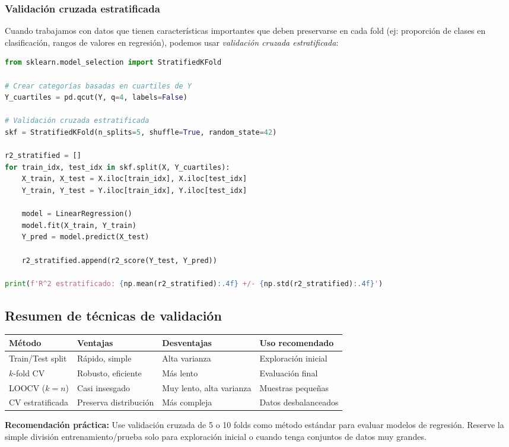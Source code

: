 \subsubsection{Validación cruzada estratificada}

Cuando trabajamos con datos que tienen características importantes que deben preservarse en cada fold (ej: proporción de clases en clasificación, rangos de valores en regresión), podemos usar \emph{validación cruzada estratificada}:

\begin{lstlisting}[language=Python]
from sklearn.model_selection import StratifiedKFold

# Crear categorías basadas en cuartiles de Y
Y_cuartiles = pd.qcut(Y, q=4, labels=False)

# Validación cruzada estratificada
skf = StratifiedKFold(n_splits=5, shuffle=True, random_state=42)

r2_stratified = []
for train_idx, test_idx in skf.split(X, Y_cuartiles):
    X_train, X_test = X.iloc[train_idx], X.iloc[test_idx]
    Y_train, Y_test = Y.iloc[train_idx], Y.iloc[test_idx]
    
    model = LinearRegression()
    model.fit(X_train, Y_train)
    Y_pred = model.predict(X_test)
    
    r2_stratified.append(r2_score(Y_test, Y_pred))

print(f'R^2 estratificado: {np.mean(r2_stratified):.4f} +/- {np.std(r2_stratified):.4f}')
\end{lstlisting}

\subsection{Resumen de técnicas de validación}

\begin{center}
	\begin{tabular}{|l|l|l|l|}\hline
		\textbf{Método} & \textbf{Ventajas} & \textbf{Desventajas} & \textbf{Uso recomendado} \\\hline
		Train/Test split & Rápido, simple & Alta varianza & Exploración inicial \\\hline
		$k$-fold CV & Robusto, eficiente & Más lento & Evaluación final \\\hline
		LOOCV ($k=n$) & Casi insesgado & Muy lento, alta varianza & Muestras pequeñas \\\hline
		CV estratificada & Preserva distribución & Más compleja & Datos desbalanceados \\\hline
	\end{tabular}
\end{center}

\begin{observacion}
	\textbf{Recomendación práctica:} Use validación cruzada de 5 o 10 folds como método estándar para evaluar modelos de regresión. Reserve la simple división entrenamiento/prueba solo para exploración inicial o cuando tenga conjuntos de datos muy grandes.
\end{observacion}
